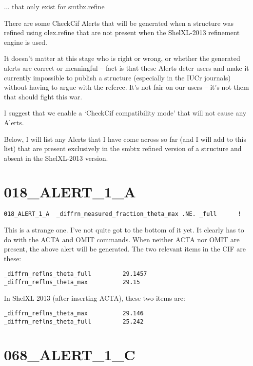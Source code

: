 \documentclass[a4paper,10pt]{article}
\begin{document}
\vspace{20pt}

{\LARGE ... that only exist for smtbx.refine}
\vspace{30pt}


There are some CheckCif Alerts that will be generated when a structure was refined using olex.refine that are not present when the ShelXL-2013 refinement engine is used.

It doesn't matter at this stage who is right or wrong, or whether the generated alerts are correct or meaningful -- fact is that these Alerts deter users and make it currently impossible to publish a structure (especially in the IUCr journals) without having to argue with the referee. It's not fair on our users -- it's not them that should fight this war.

I suggest that we enable a `CheckCif compatibility mode' that will not cause any Alerts.

Below, I will list any Alerts that I have come across so far (and I will add to this list) that are present exclusively in the smbtx refined version of a structure and absent in the ShelXL-2013 version.


\section*{018\_ALERT\_1\_A}

{\bf
\begin{verbatim}
018_ALERT_1_A  _diffrn_measured_fraction_theta_max .NE. _full      !
\end{verbatim}
}

This is a strange one. I've not quite got to the bottom of it yet. It clearly has to do with the ACTA and OMIT commands. When neither ACTA nor OMIT are present, the above alert will be generated. The two relevant items in the CIF are these:

\begin{verbatim}
_diffrn_reflns_theta_full         29.1457
_diffrn_reflns_theta_max          29.15
\end{verbatim}

In ShelXL-2013 (after inserting ACTA), these two items are:

\begin{verbatim}
_diffrn_reflns_theta_max          29.146
_diffrn_reflns_theta_full         25.242
\end{verbatim}

\section*{068\_ALERT\_1\_C}
\end{document}
